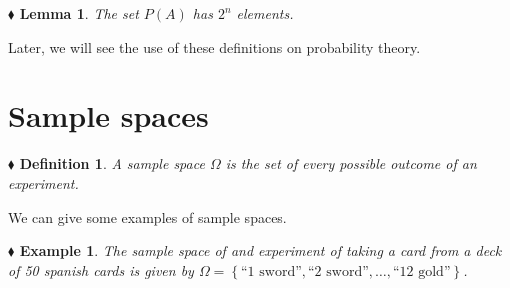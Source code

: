 \documentclass{report}
\newtheorem{example}{$\blacklozenge$ Example}[chapter]
\newtheorem{lemma}{$\blacklozenge$ Lemma}[chapter]
\newtheorem{definition}{$\blacklozenge$ Definition}[chapter]
\begin{document}
\begin{lemma}
    The set $P(A)$ has $2^{n}$ elements.
\end{lemma}

Later, we will see the use of these definitions on probability theory.

\section{Sample spaces}
\begin{definition}
    A sample space $\Omega$ is the set of \textit{every} possible outcome
    of an experiment.
\end{definition}
We can give some examples of sample spaces.
\begin{example}
    The sample space of and experiment of taking a card from a deck of 50 spanish cards is
    given by $\Omega = \left\{\text{``1 sword''}, \text{``2 sword''}, \dots, \text{``12 gold''}\right\}$.
\end{example}
\end{document}
